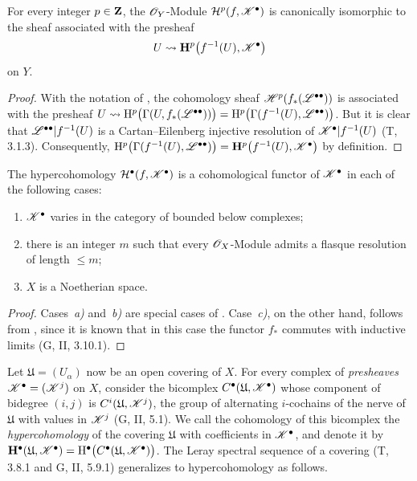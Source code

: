 \begin{proposition}[12.4.3]
\label{0.12.4.3}
For every integer $p\in\mathbf{Z}$, the $\mathscr{O}_Y$-Module
$\mathcal{H}^p(f,\mathscr{K}^\bullet)$ is canonically isomorphic to the sheaf
associated with the presheaf
\[
  U\leadsto
  \mathbf{H}^p\bigl(f^{-1}(U),\mathscr{K}^\bullet\bigr)
\]
on $Y$.
\end{proposition}

\begin{proof}
With the notation of , the cohomology sheaf
$\mathscr{H}^p(f_*(\mathscr{L}^{\bullet\bullet}))$ is associated with the
presheaf $U\leadsto
\mathrm{H}^p\bigl(\Gamma(U,f_*(\mathscr{L}^{\bullet\bullet}))\bigr)
=
\mathrm{H}^p\bigl(\Gamma(f^{-1}(U),\mathscr{L}^{\bullet\bullet})\bigr)$.
But it is clear that
$\mathscr{L}^{\bullet\bullet}|f^{-1}(U)$ is a Cartan--Eilenberg injective
resolution of $\mathscr{K}^\bullet|f^{-1}(U)$ (T, 3.1.3).
Consequently, $\mathrm{H}^p\bigl(\Gamma(f^{-1}(U),\mathscr{L}^{\bullet\bullet})\bigr)
=
\mathbf{H}^p\bigl(f^{-1}(U),\mathscr{K}^\bullet\bigr)$
by definition.
\end{proof}

\begin{proposition}[12.4.4]
\label{0.12.4.4}
The hypercohomology $\mathcal{H}^\bullet(f,\mathscr{K}^\bullet)$ is a
cohomological functor of $\mathscr{K}^\bullet$ in each of the following
cases:
\begin{enumerate}
  \item[\rm{a)}] $\mathscr{K}^\bullet$ varies in the category of bounded
    below complexes;
  \item[\rm{b)}] there is an integer $m$ such that every
    $\mathscr{O}_X$-Module admits a flasque resolution of length $\leq m$;
  \item[\rm{c)}] $X$ is a Noetherian space.
\end{enumerate}
\end{proposition}

\begin{proof}
Cases~\emph{a)} and~\emph{b)} are special cases of .
Case~\emph{c)}, on the other hand, follows from , since it is known
that in this case the functor $f_*$ commutes with inductive limits
(G, II, 3.10.1).
\end{proof}

\begin{env}[12.4.5]
\label{0.12.4.5}
Let $\mathfrak{U}=(U_\alpha)$ now be an open covering of $X$.
For every complex of \emph{presheaves}
$\mathscr{K}^\bullet=(\mathscr{K}^j)$ on $X$, consider the bicomplex
$C^\bullet(\mathfrak{U},\mathscr{K}^\bullet)$ whose
component of bidegree $(i,j)$ is
$C^i(\mathfrak{U},\mathscr{K}^j)$, the group of
alternating $i$-cochains of the nerve of $\mathfrak{U}$ with values
in $\mathscr{K}^j$ (G, II, 5.1).
We call the cohomology of this bicomplex the
\emph{hypercohomology} of the covering $\mathfrak{U}$ with
coefficients in $\mathscr{K}^\bullet$, and denote it by $\mathbf{H}^\bullet(\mathfrak{U},\mathscr{K}^\bullet)
=
\mathrm{H}^\bullet
\bigl(C^\bullet
(\mathfrak{U},\mathscr{K}^\bullet)\bigr)$.
The Leray spectral sequence of a covering
(T, 3.8.1 and G, II, 5.9.1) generalizes to hypercohomology as follows.
\end{env}

